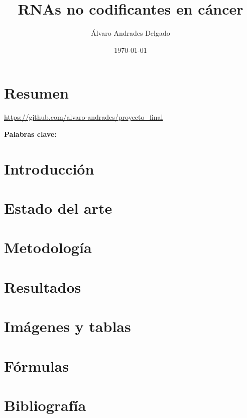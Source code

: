 \documentclass[a4paper,11pt]{article}
\begin{document}
\title{RNAs no codificantes en cáncer}
\author{Álvaro Andrades Delgado}
\date{\today}
\maketitle

\section{Resumen}

\url{https://github.com/alvaro-andrades/proyecto_final} 

\textbf{Palabras clave:}


\section{Introducción}


\section{Estado del arte}


\section{Metodología}


\section{Resultados}



\section{Imágenes y tablas}


\section{Fórmulas}



\section{Bibliografía}




\end{document}
